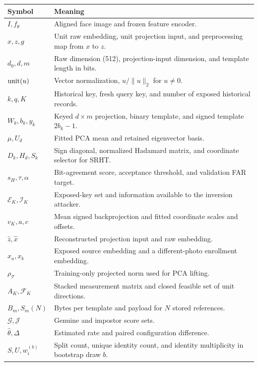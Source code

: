 \par\medskip\noindent\begin{minipage}{\columnwidth}
\makeatletter{}\makeatother
\caption{Notation used in the protection and evaluation models.}
\label{tab:notation}\centering\footnotesize
\renewcommand{\arraystretch}{1.12}
\begin{tabularx}{\columnwidth}{@{}p{1.65cm}>{\raggedright\arraybackslash}X@{}}
\toprule Symbol & Meaning \\\midrule
$I,f_\theta$ & Aligned face image and frozen feature encoder.\\
$x,z,g$ & Unit raw embedding, unit projection input, and preprocessing map from $x$ to $z$.\\
$d_0,d,m$ & Raw dimension (512), projection-input dimension, and template length in bits.\\
$\operatorname{unit}(u)$ & Vector normalization, $u/\|u\|_2$ for $u\ne0$.\\
$k,q,K$ & Historical key, fresh query key, and number of exposed historical records.\\
$W_k,b_k,y_k$ & Keyed $d\times m$ projection, binary template, and signed template $2b_k-1$.\\
$\mu,U_d$ & Fitted PCA mean and retained eigenvector basis.\\
$D_k,H_d,S_k$ & Sign diagonal, normalized Hadamard matrix, and coordinate selector for SRHT.\\
$s_H,\tau,\alpha$ & Bit-agreement score, acceptance threshold, and validation FAR target.\\
$\mathcal E_K,\mathcal I_K$ & Exposed-key set and information available to the inversion attacker.\\
$v_K,a,c$ & Mean signed backprojection and fitted coordinate scales and offsets.\\
$\hat z,\hat x$ & Reconstructed projection input and raw embedding.\\
$x_a,x_b$ & Exposed source embedding and a different-photo enrollment embedding.\\
$\rho_{\mathcal T}$ & Training-only projected norm used for PCA lifting.\\
$A_K,\mathcal F_K$ & Stacked measurement matrix and closed feasible set of unit directions.\\
$B_m,S_m(N)$ & Bytes per template and payload for $N$ stored references.\\
$\mathcal G,\mathcal J$ & Genuine and impostor score sets.\\
$\hat\theta,\Delta$ & Estimated rate and paired configuration difference.\\
$S,U,w_i^{(b)}$ & Split count, unique identity count, and identity multiplicity in bootstrap draw $b$.\\
\bottomrule
\end{tabularx}
\end{minipage}\par\medskip
